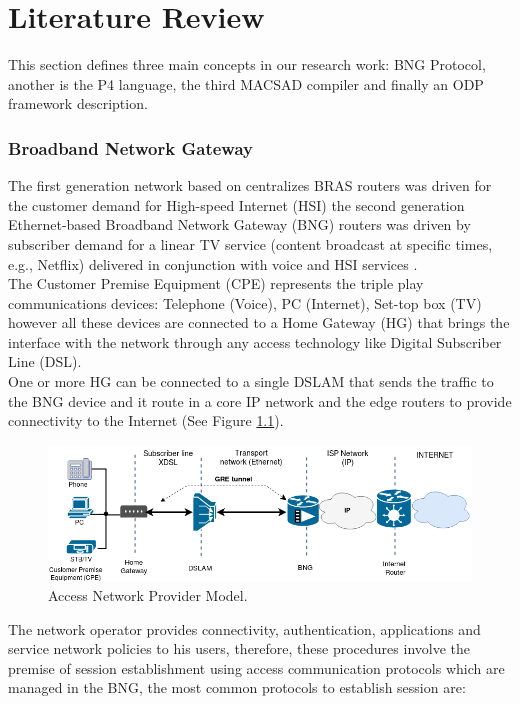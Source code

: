 \chapter{Literature Review}
\label{cap:cap02}
 This section defines three main concepts in our research work: \acrshort{BNG} Protocol, another is the \acrshort{P4} language, the third MACSAD compiler and finally an ODP framework description.

\subsection{Broadband Network Gateway}

 The first generation network based on centralizes BRAS routers was driven for the customer demand for High-speed Internet (HSI) the second generation Ethernet-based Broadband Network Gateway (BNG) routers was driven by subscriber demand for a linear TV service (content broadcast at specific times, e.g., Netflix) delivered in conjunction with voice and HSI services \cite{Alcatel}.\\
 The Customer Premise Equipment (CPE) represents the triple play communications devices: Telephone (Voice), PC (Internet), Set-top box (TV) however all these devices are connected to a Home Gateway (HG) that brings the interface with the network through any access technology like Digital Subscriber Line (DSL).\\
 One or more HG can be connected to a single DSLAM that sends the traffic to the BNG device and it route in a core IP network and the edge routers to provide connectivity to the Internet (See Figure \ref{fig:arch}).\\
 \begin{figure}[!h]
 	\centering
 	\includegraphics[width=0.8\linewidth]{figures/bng_architect.png}
 	\caption{Access Network Provider Model.}
 	\label{fig:arch}
\end{figure}
The network operator provides connectivity, authentication, applications and service network  policies to his users, therefore, these procedures involve the premise of session establishment using access communication protocols which are managed in the BNG, the most common protocols to establish session are:
